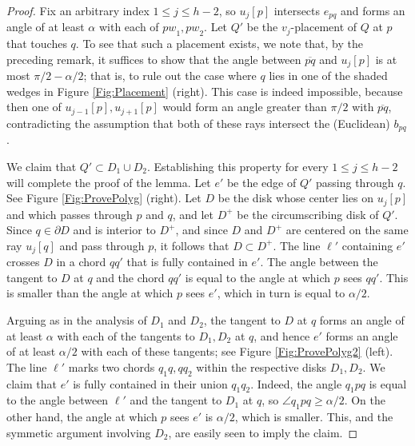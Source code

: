 \documentclass[letter,11pt]{article}
\def\bisect{b}
\begin{document}
\begin{proof}
Fix an arbitrary index $1\leq j\leq h-2$, so $u_j[p]$ intersects $e_{pq}$ 
and forms an angle of at least $\alpha$ with each of ${pw}_1,{pw}_2$.
Let $Q'$ be the $v_j$-placement of $Q$
at $p$ that touches $q$. To see that such a placement exists, we note that, by the preceding remark, it suffices to show that the angle between
$\overline{pq}$ and $u_j[p]$ is at most $\pi/2-\alpha/2$; that is, to rule out the case where $q$ lies in one of the shaded wedges in Figure \ref{Fig:Placement} (right). This case is indeed impossible, because then one of $u_{j-1}[p],u_{j+1}[p]$ would form an angle greater than $\pi/2$ with 
$\overline{pq}$, contradicting the assumption that both of these rays intersect the (Euclidean) $\bisect_{pq}$.

We claim that $Q' \subset D_1\cup D_2$. 
Establishing this property for every $1\leq j\leq h-2$ will complete 
the proof of the lemma. 
Let $e'$ be the edge of $Q'$ passing through $q$. See Figure \ref{Fig:ProvePolyg} (right). Let $D$ be the disk 
whose center lies on $u_j[p]$ and which passes through $p$ and $q$, 
and let $D^+$ be the circumscribing disk of $Q'$. 
Since $q\in \partial D$ and is interior to $D^+$, and since $D$ and 
$D^+$ are centered on the same ray $u_j[q]$ and pass through $p$, it 
follows that $D \subset D^+$. 
The line $\ell'$ containing $e'$ crosses $D$ in a chord $qq'$ that
is fully contained in $e'$. The angle between the tangent to $D$ at 
$q$ and the chord $qq'$ is equal to the angle at which $p$ sees $qq'$. 
This is smaller than the angle at which $p$ sees $e'$, which in turn 
is equal to $\alpha/2$.

Arguing as in the analysis of $D_1$ and $D_2$, the tangent to $D$ at $q$ forms an angle of at least $\alpha$ with each of the tangents to $D_1,D_2$ at $q$, and hence $e'$ forms an angle of at least $\alpha/2$ with each of these tangents; see Figure \ref{Fig:ProvePolyg2} (left).
The line $\ell'$ marks two chords $q_1q,qq_2$ within the respective disks $D_1,D_2$. We claim that $e'$ is fully contained in their union $q_1q_2$. Indeed, the angle $q_1pq$ is equal to the angle between $\ell'$ and the tangent to $D_1$ at $q$, so $\angle q_1pq\geq \alpha/2$.
On the other hand, the angle at which $p$ sees $e'$ is $\alpha/2$, which is smaller. This, and the symmetic argument involving $D_2$, are easily seen to imply the claim.


\end{proof}
\end{document}
